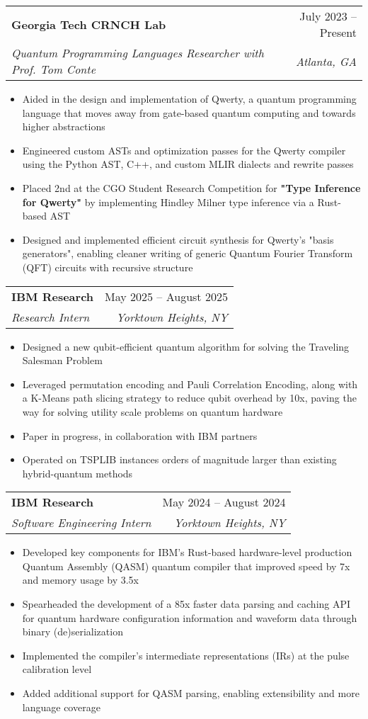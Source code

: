 \documentclass[letterpaper,11pt]{article}
\makeatletter
\newcommand{\resumeItem}[1]{
  \item\small{
    {#1 \vspace{-1pt}}
  }
}
\newcommand{\resumeSubheading}[4]{
  \vspace{-2pt}\item
    \begin{tabular*}{0.97\textwidth}[t]{l@{\extracolsep{\fill}}r}
      \textbf{#1} & #2 \\
      \textit{\small#3} & \textit{\small #4} \\
    \end{tabular*}\vspace{-7pt}
}
\newcommand{\resumeItemListStart}{\begin{itemize}}
\newcommand{\resumeItemListEnd}{\end{itemize}\vspace{-5pt}}
\makeatother
\begin{document}
      \resumeSubheading
          {Georgia Tech CRNCH Lab}{July 2023 -- Present}
          {Quantum Programming Languages Researcher with Prof. Tom Conte}{Atlanta, GA}
          \resumeItemListStart
            \resumeItem{Aided in the design and implementation of Qwerty, a quantum programming language that moves away from gate-based quantum computing and towards higher abstractions}
            \resumeItem{Engineered custom ASTs and optimization passes for the Qwerty compiler using the Python AST, C++, and custom MLIR dialects and rewrite passes}
            \resumeItem{Placed 2nd at the CGO Student Research Competition for \textbf{"Type Inference for Qwerty"} by implementing Hindley Milner type inference via a Rust-based AST}
            \resumeItem{Designed and implemented efficient circuit synthesis for Qwerty's "basis generators", enabling cleaner writing of generic Quantum Fourier Transform (QFT) circuits with recursive structure}
            
          \resumeItemListEnd

    \resumeSubheading
      {IBM Research}{May 2025 -- August 2025}
      {Research Intern}{Yorktown Heights, NY}
      \resumeItemListStart
        \resumeItem{Designed a new qubit-efficient quantum algorithm for solving the Traveling Salesman Problem}
        \resumeItem{Leveraged permutation encoding and Pauli Correlation Encoding, along with a K-Means path slicing strategy to reduce qubit overhead by 10x, paving the way for solving utility scale problems on quantum hardware}
        \resumeItem{Paper in progress, in collaboration with IBM partners}
        \resumeItem{Operated on TSPLIB instances orders of magnitude larger than existing hybrid-quantum methods}
      \resumeItemListEnd

    \resumeSubheading
      {IBM Research}{May 2024 -- August 2024}
      {Software Engineering Intern}{Yorktown Heights, NY}
      \resumeItemListStart
        \resumeItem{Developed key components for IBM's Rust-based hardware-level production Quantum Assembly (QASM) quantum compiler that improved speed by 7x and memory usage by 3.5x}
        \resumeItem{Spearheaded the development of a 85x faster data parsing and caching API for quantum hardware configuration information and waveform data through binary (de)serialization}
        \resumeItem{Implemented the compiler's intermediate representations (IRs) at the pulse calibration level}
        \resumeItem{Added additional support for QASM parsing, enabling extensibility and more language coverage}
      \resumeItemListEnd
\end{document}
